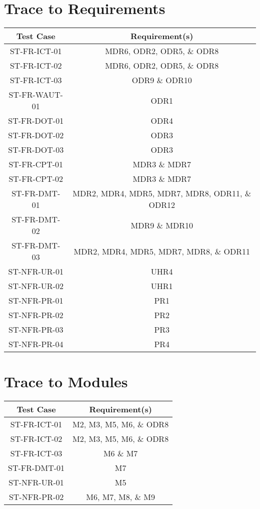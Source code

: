 \documentclass[12pt, titlepage]{article}
\begin{document}
\section{Trace to Requirements}
\begin{center}
\begin{tabular}{||c c||} 
 \hline
 Test Case & Requirement(s)  \\ [0.5ex] 
 \hline\hline
 ST-FR-ICT-01 & MDR6, ODR2, ODR5, \& ODR8 \\ 
 \hline
 ST-FR-ICT-02 & MDR6, ODR2, ODR5, \& ODR8 \\ 
 \hline
 ST-FR-ICT-03 & ODR9 \& ODR10 \\ 
 \hline
 ST-FR-WAUT-01 & ODR1\\ 
 \hline
 ST-FR-DOT-01 & ODR4 \\ 
 \hline
 ST-FR-DOT-02 & ODR3 \\ 
 \hline
 ST-FR-DOT-03 & ODR3 \\ 
 \hline
 ST-FR-CPT-01 & MDR3 \& MDR7 \\ 
 \hline 
 ST-FR-CPT-02 & MDR3 \& MDR7 \\ 
 \hline
 ST-FR-DMT-01 & MDR2, MDR4, MDR5, MDR7, MDR8, ODR11, \& ODR12 \\ 
 \hline
 ST-FR-DMT-02 & MDR9 \& MDR10 \\ 
 \hline
 ST-FR-DMT-03 & MDR2, MDR4, MDR5, MDR7, MDR8, \& ODR11 \\ 
 \hline
 ST-NFR-UR-01 & UHR4  \\ 
 \hline
 ST-NFR-UR-02 & UHR1 \\
 \hline
 ST-NFR-PR-01 & PR1  \\
 \hline
 ST-NFR-PR-02 & PR2 \\
 \hline
 ST-NFR-PR-03 & PR3 \\ [1ex] 
 \hline
 ST-NFR-PR-04 & PR4 \\ [1ex] 
 \hline
\end{tabular}
\end{center}
		
\section{Trace to Modules}
\begin{center}
\begin{tabular}{||c c||} 
 \hline
 Test Case & Requirement(s)  \\ [0.5ex] 
 \hline\hline
 ST-FR-ICT-01 & M2, M3, M5, M6, \& ODR8 \\ 
 \hline
 ST-FR-ICT-02 & M2, M3, M5, M6, \& ODR8 \\ 
 \hline
 ST-FR-ICT-03 & M6 \& M7 \\ 
 \hline
 ST-FR-DMT-01 & M7 \\ 
 \hline
 ST-NFR-UR-01 & M5  \\ 
 \hline
 ST-NFR-PR-02 & M6, M7, M8, \& M9 \\
 \hline
\end{tabular}
\end{center}
\end{document}
